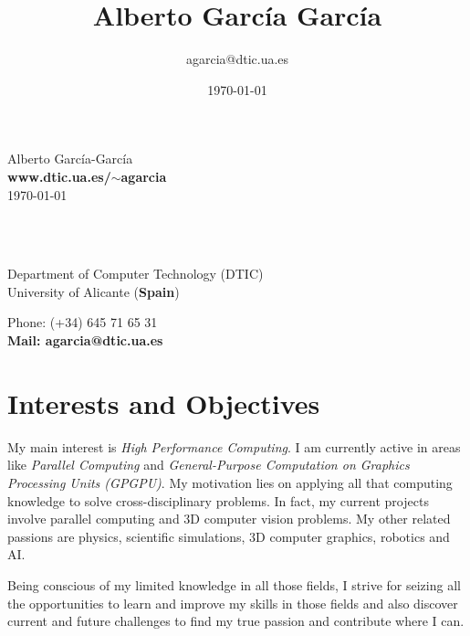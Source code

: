 \documentclass[8pt]{article}
\title{\bfseries\Huge Alberto García García}
\author{agarcia@dtic.ua.es}
\date{\today}
\begin{document}
\begin{center}
	\Huge Alberto García-García\\
	\Large \textbf{www.dtic.ua.es/$\sim$agarcia}\\
	\today
\end{center}
\noindent\makebox[\linewidth]{\rule{0.88\paperwidth}{0.4pt}}
\\\ \\
\begin{minipage}[ht]{0.7\textwidth}
Department of Computer Technology (DTIC)\\
University of Alicante (\textbf{Spain})\\
\end{minipage}
\begin{minipage}[ht]{0.48\textwidth}
Phone: (+34) 645 71 65 31\\
\textbf{Mail: agarcia@dtic.ua.es}\\
\end{minipage}
 
\section*{Interests and Objectives}

My main interest is \emph{High Performance Computing}. I am currently active in areas like \emph{Parallel Computing} and \emph{General-Purpose Computation on Graphics Processing Units (GPGPU)}. My motivation lies on applying all that computing knowledge to solve cross-disciplinary problems. In fact, my current projects involve parallel computing and 3D computer vision problems. My other related passions are physics, scientific simulations, 3D computer graphics, robotics and AI.

Being conscious of my limited knowledge in all those fields, I strive for seizing all the opportunities to learn and improve my skills in those fields and also discover current and future challenges to find my true passion and contribute where I can.
 
\end{document}
